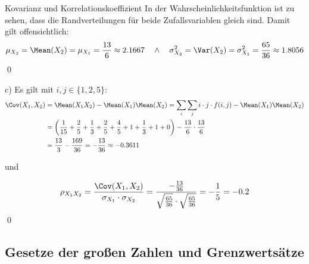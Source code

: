 \begin{example}{Kovarianz und Korrelationskoeffizient}
    In der Wahrscheinlichkeitsfunktion ist zu sehen, dass die Randverteilungen für beide Zufallsvariablen gleich sind.
    Damit gilt offensichtlich:
    \[
        \mu_{X_2} = \Mean(X_2) = \mu_{X_1} = \frac{13}{6} \approx 2.1667 \quad \land \quad \sigma^2_{X_2} = \Var(X_2) = \sigma^2_{X_1} = \frac{65}{36} \approx 1.8056
    \]
    \qed

    c) Es gilt mit $i,j \in \{1,2,5\}$:
    \begin{alignat*}{1}
        \Cov(X_1, X_2) & = \Mean(X_1X_2) - \Mean(X_1)\Mean(X_2) = \sum_i \sum_j i \cdot j \cdot f(i,j) - \Mean(X_1)\Mean(X_2)                                              \\
                       & = \left( \frac{1}{15} + \frac{2}{5} + \frac{1}{3} + \frac{2}{5} + \frac{4}{5} + 1 + \frac{1}{3} + 1 + 0 \right) - \frac{13}{6} \cdot \frac{13}{6} \\
                       & = \frac{13}{3} - \frac{169}{36}  = -\frac{13}{36} \approx -0.3611
    \end{alignat*}

    und

    \[
        \rho_{X_1X_2} = \frac{\Cov(X_1,X_2)}{\sigma_{X_1} \cdot \sigma_{X_2}} = \frac{-\frac{13}{36}}{\sqrt{\frac{65}{36}} \cdot \sqrt{\frac{65}{36}}} = -\frac{1}{5} = -0.2
    \]
    \qed
\end{example}

\subsection{Gesetze der großen Zahlen und Grenzwertsätze}

